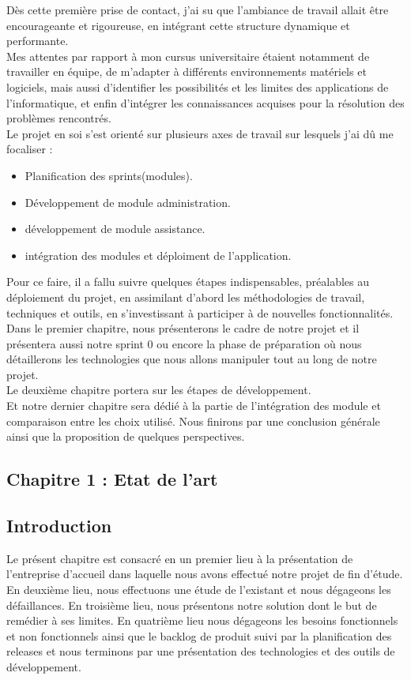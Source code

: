 \documentclass{article}
\begin{document}
Dès cette première prise de contact, j'ai su que l'ambiance de travail allait être encourageante et rigoureuse, en intégrant cette structure dynamique et performante.\\
Mes attentes par rapport à mon cursus universitaire étaient notamment de travailler en équipe, de m'adapter à différents environnements matériels et logiciels, mais aussi d'identifier les possibilités et les limites des applications de l'informatique, et enfin d'intégrer les connaissances acquises pour la résolution des problèmes rencontrés.\\
Le projet en soi s'est orienté sur plusieurs axes de travail sur lesquels j'ai dû me focaliser :
\begin{itemize}
\item Planification des sprints(modules).
\item Développement de module administration.
\item développement de module assistance.
\item intégration des modules et déploiment de l'application.
\end{itemize}
Pour ce faire, il a fallu suivre quelques étapes indispensables, préalables au déploiement du projet, en assimilant d'abord les méthodologies de travail, techniques et outils, en s'investissant à participer à de nouvelles fonctionnalités.\\
Dans le premier chapitre, nous présenterons le cadre de notre projet et il présentera aussi notre sprint 0 ou encore la phase de préparation où nous détaillerons les technologies que nous allons manipuler tout au long de notre projet.\\
 Le deuxième chapitre portera sur les étapes de développement.\\
Et notre dernier chapitre sera dédié à la partie de l’intégration des module et comparaison entre les choix utilisé. Nous finirons par une conclusion générale ainsi que la proposition de quelques perspectives. 
\cleardoublepage
\begin{center}
\section*{Chapitre 1 : Etat de l’art}
\end{center}
\subsection{Introduction}
Le présent chapitre est consacré en un premier lieu à la présentation de l’entreprise d’accueil dans laquelle nous avons eﬀectué notre projet de fin d’étude.\\ En deuxième lieu, nous eﬀectuons une étude de l’existant et nous dégageons les défaillances. En troisième lieu, nous présentons notre solution dont le but de remédier à ses limites. En quatrième lieu nous dégageons les besoins fonctionnels et non fonctionnels ainsi que le backlog de produit suivi par la planification des releases et nous terminons par une présentation des technologies et des outils de développement.
\end{document}
